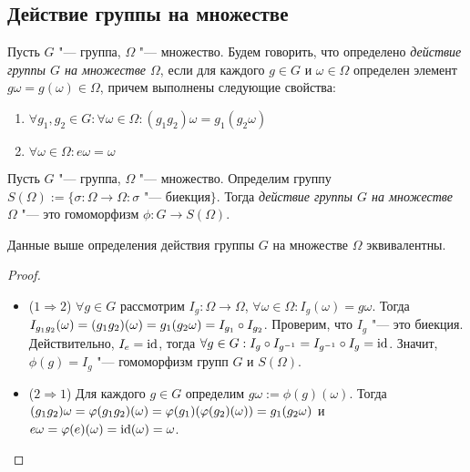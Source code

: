 \subsection{Действие группы на множестве}

\begin{definition}
	Пусть $G$ "--- группа, $\Omega$ "--- множество. Будем говорить, что определено \textit{действие группы $G$ на множестве $\Omega$}, если для каждого $g \in G$ и $\omega \in \Omega$ определен элемент $g\omega = g(\omega) \in \Omega$, причем выполнены следующие свойства:
	\begin{enumerate}
		\item $\forall g_1, g_2 \in G: \forall \omega \in \Omega: (g_1g_2)\omega = g_1(g_2\omega)$
		\item $\forall \omega \in \Omega: e\omega = \omega$
	\end{enumerate}
\end{definition}

\begin{definition}
	Пусть $G$ "--- группа, $\Omega$ "--- множество. Определим группу $S(\Omega) := \{\sigma: \Omega \to \Omega: \sigma\text{ "--- биекция}\}$. Тогда \textit{действие группы $G$ на множестве $\Omega$} "--- это гомоморфизм $\phi: G \to S(\Omega)$.
\end{definition}

\begin{proposition}
	Данные выше определения действия группы $G$ на множестве $\Omega$ эквивалентны.
\end{proposition}

\begin{proof}~
	\begin{itemize}
		\item ($1 \Rightarrow 2$) $\forall g \in G$ рассмотрим $I_g: \Omega \to \Omega$, $\forall \omega \in \Omega: I_g(\omega) = g\omega$. Тогда $I_{g_1g_2}(\omega) \hm= (g_1g_2)(\omega) = g_1(g_2\omega) = I_{g_1}\circ I_{g_2}$. Проверим, что $I_g$ "--- это биекция. Действительно, $I_e = \operatorname{id}$, тогда $\forall g \in G: I_g\circ I_{g^{-1}} = I_{g^{-1}}\circ I_g = \operatorname{id}$. Значит, $\phi(g) = I_g$ "--- гомоморфизм групп $G$ и $S(\Omega)$.
		\item($2 \Rightarrow 1$) Для каждого $g \in G$ определим $g\omega := \phi(g)(\omega)$. Тогда $(g_1g_2)\omega = \phi(g_1g_2)(\omega) \hm= \phi(g_1)(\phi(g_2)(\omega)) = g_1(g_2\omega)$ и $e\omega \hm= \phi(e)(\omega) = \id(\omega) = \omega$.
	\end{itemize}
\end{proof}

